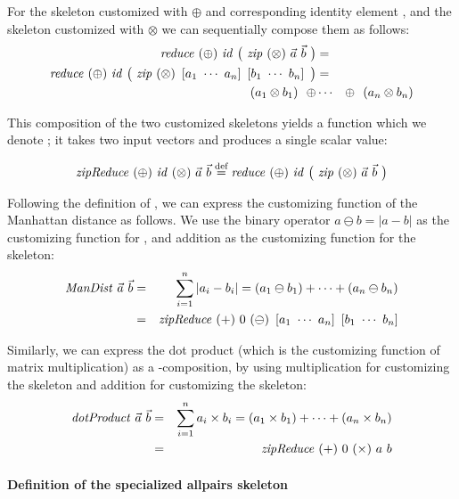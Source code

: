 For the \reduce skeleton customized with $\oplus$ and corresponding identity element \id, and the \zip skeleton customized with $\otimes$ we can sequentially compose them as follows:
\begin{eqnarray*}
  \reduce\ (\oplus)\ \id\ \big(\ \zip\ (\otimes)\ \vec{a}\ \vec{b}\ \big) &=&\\
  \reduce\ (\oplus)\ \id\ \big(\ \zip\ (\otimes)\ \DottedVector{a_1}{a_n}\ \DottedVector{b_1}{b_n}\ \big) &=&\\
  (a_1 \otimes b_1)\ \ \oplus &\cdots& \oplus\ \ (a_n \otimes b_n)
\end{eqnarray*}

This composition of the two customized skeletons yields a function which we denote \zipReduce; it takes two input vectors and produces a single scalar value:

\begin{equation*}
  \zipReduce\ (\oplus)\ \id\ (\otimes)\ \vec{a}\ \vec{b} \eqdef 
  \reduce\ (\oplus)\ \id\ \big(\ \zip\ (\otimes)\ \vec{a}\ \vec{b}\ \big)
\end{equation*}

Following the definition of \zipReduce, we can express the customizing function of the Manhattan distance as follows.
We use the binary operator $a \ominus b = |a - b|$ as the customizing function for \zip, and addition as the customizing function for the \reduce skeleton:
\begin{eqnarray*}
    \ManDist\ \vec{a}\ \vec{b} &=& \sum_{i=1}^{n} | a_i - b_i | = (a_1 \ominus b_1) + \cdots + (a_n \ominus b_n)\\
    &=& \zipReduce\ (+)\ 0\ (\ominus)\ \DottedVector{a_1}{a_n}\ \DottedVector{b_1}{b_n}
\end{eqnarray*}

Similarly, we can express the dot product (which is the customizing function of matrix multiplication) as a \zip-\reduce composition, by using multiplication for customizing the \zip skeleton and addition for customizing the \reduce skeleton:
\begin{eqnarray*}
  \mbox{\emph{dotProduct}}\ \vec{a}\ \vec{b} &=& \sum_{i = 1}^{n} a_i \times b_i = (a_1 \times b_1) + \cdots + (a_n \times b_n)\\
  &=& \text{\textit{zipReduce}}\ (+)\ 0\ (\times)\ a\ b
\end{eqnarray*}

\paragraph{Definition of the specialized allpairs skeleton}

